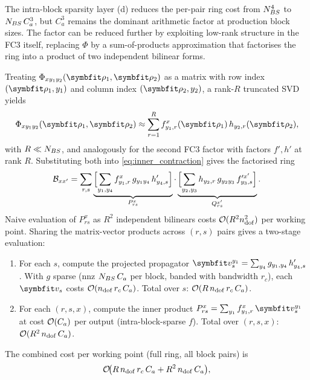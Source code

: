 The intra-block sparsity layer (d) reduces the per-pair ring cost
from $N_{BS}^{4}$ to $N_{BS}\,C_a^{3}$, but $C_a^{3}$ remains the
dominant arithmetic factor at production block sizes. The factor can
be reduced further by exploiting low-rank structure in the FC3
itself, replacing $\Phi$ by a sum-of-products approximation that
factorises the ring into a product of two independent bilinear
forms.

Treating $\Phi_{xy_1y_2}(\vc\rho_1,\vc\rho_2)$ as a matrix with row
index $(\vc\rho_1,y_1)$ and column index $(\vc\rho_2,y_2)$, a
rank-$R$ truncated SVD yields
\begin{equation}\label{eq:fc3_lowrank}
  \Phi_{xy_1y_2}(\vc\rho_1,\vc\rho_2)
  \approx \sum_{r=1}^{R}
    f^{x}_{y_1,r}(\vc\rho_1)\,
    h_{y_2,r}(\vc\rho_2),
\end{equation}
with $R \ll N_{BS}$, and analogously for the second FC3 factor with
factors $f',h'$ at rank $R$.  Substituting both into
\cref{eq:inner_contraction} gives the factorised ring
\begin{equation}\label{eq:sep_split}
  \mathcal{B}_{xx'}
  = \sum_{r,s}
    \underbrace{
      \Bigl[\sum_{y_1,y_4}f^{x}_{y_1,r}\,g_{y_1y_4}\,h'_{y_4,s}\Bigr]
    }_{P^{x}_{rs}}
    \cdot
    \underbrace{
      \Bigl[\sum_{y_2,y_3}h_{y_2,r}\,g_{y_2y_3}\,f'^{x'}_{y_3,s}\Bigr]
    }_{Q^{x'}_{rs}}.
\end{equation}
Naive evaluation of $P^{x}_{rs}$ as $R^{2}$ independent bilinears
costs $\mathcal{O}(R^{2}n_{\mathrm{dof}}^{2})$ per working point. Sharing the
matrix-vector products across $(r,s)$ pairs gives a two-stage
evaluation:
\begin{enumerate}
  \item For each $s$, compute the projected propagator
    $\vc{v}_s^{y_1} = \sum_{y_4}g_{y_1,y_4}\,h'_{y_4,s}$. With $g$
    sparse (nnz $N_{BS}\,C_a$ per block, banded with bandwidth $r_c$),
    each $\vc{v}_s$ costs $\mathcal{O}(n_{\mathrm{dof}}\,r_c\,C_a)$. Total over $s$:
    $\mathcal{O}(R\,n_{\mathrm{dof}}\,r_c\,C_a)$.
  \item For each $(r,s,x)$, compute the inner product
    $P^{x}_{rs} = \sum_{y_1}f^{x}_{y_1,r}\,\vc{v}_s^{y_1}$ at cost
    $\mathcal{O}(C_a)$ per output (intra-block-sparse $f$). Total over
    $(r,s,x)$: $\mathcal{O}(R^{2}\,n_{\mathrm{dof}}\,C_a)$.
\end{enumerate}
The combined cost per working point (full ring, all block pairs) is
\begin{equation}\label{eq:cost_opt}
  \mathcal{O}\!\bigl(R\,n_{\mathrm{dof}}\,r_c\,C_a + R^{2}\,n_{\mathrm{dof}}\,C_a\bigr),
\end{equation}
